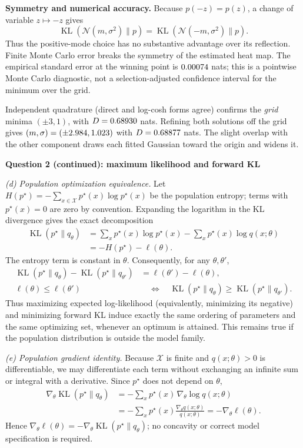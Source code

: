 \documentclass[12pt]{article}
\newcommand{\KL}{\operatorname{KL}}
\newcommand{\N}{\mathcal{N}}
\begin{document}
\textbf{Symmetry and numerical accuracy.}
Because $p(-z)=p(z)$, a change of variable $z\mapsto-z$ gives
\[
\KL(\N(m,\sigma^2)\|p)=\KL(\N(-m,\sigma^2)\|p).
\]
Thus the positive-mode choice has no substantive advantage over its reflection.
Finite Monte Carlo error breaks the symmetry of the estimated heat map. The
empirical standard error at the winning point is $0.00074$ nats; this is a
pointwise Monte Carlo diagnostic, not a selection-adjusted confidence interval
for the minimum over the grid.

Independent quadrature (direct and log-cosh forms agree) confirms the \emph{grid}
minima $(\pm3,1)$, with $D=0.68930$ nats. Refining both solutions off the grid
gives $(m,\sigma)=(\pm2.984,1.023)$ with
$D=0.68877$ nats. The slight overlap with the other component draws each
fitted Gaussian toward the origin and widens it.

\clearpage
\textbf{Question 2 (continued): maximum likelihood and forward KL}

\textit{(d) Population optimization equivalence.}
Let $H(p^\star)=-\sum_{x\in\mathcal X}p^\star(x)\log p^\star(x)$ be the population
entropy; terms with $p^\star(x)=0$ are zero by convention. Expanding the logarithm in
the KL divergence gives the exact decomposition
\[
\begin{aligned}
\KL(p^\star\|q_\theta)
&=\sum_xp^\star(x)\log p^\star(x)
  -\sum_xp^\star(x)\log q(x;\theta)\\
&=\boxed{-H(p^\star)-\ell(\theta)}.
\end{aligned}
\]
The entropy term is constant in $\theta$. Consequently, for any $\theta,\theta'$,
\[
\begin{aligned}
\KL(p^\star\|q_\theta)-\KL(p^\star\|q_{\theta'})
 &=\ell(\theta')-\ell(\theta),\\
\ell(\theta)\le\ell(\theta')
 &\quad\Longleftrightarrow\quad
 \KL(p^\star\|q_\theta)\ge\KL(p^\star\|q_{\theta'}).
\end{aligned}
\]
Thus maximizing expected log-likelihood (equivalently, minimizing its negative)
and minimizing forward KL induce exactly the same ordering of parameters and
the same optimizing set, whenever an optimum is attained. This remains true if
the population distribution is outside the model family.

\textit{(e) Population gradient identity.}
Because $\mathcal X$ is finite and $q(x;\theta)>0$ is differentiable, we may
differentiate each term without exchanging an infinite sum or integral with a
derivative. Since $p^\star$ does not depend on $\theta$,
\[
\begin{aligned}
\nabla_\theta\KL(p^\star\|q_\theta)
&=-\sum_xp^\star(x)\,\nabla_\theta\log q(x;\theta)\\
&=-\sum_xp^\star(x)\frac{\nabla_\theta q(x;\theta)}{q(x;\theta)}
=-\nabla_\theta\ell(\theta).
\end{aligned}
\]
Hence $\boxed{\nabla_\theta\ell(\theta)=-\nabla_\theta\KL(p^\star\|q_\theta)}$;
no concavity or correct model specification is required.
\end{document}
